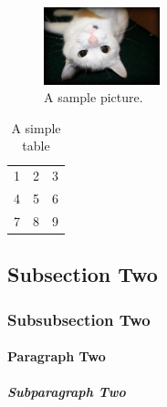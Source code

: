 \documentclass{doc}
\begin{document}
\begin{figure}[ht]
	\includegraphics[width=0.3\textwidth]{myfigure}
	\caption{A sample picture.}
\end{figure}

\begin{table}[ht]
	\begin{tabular}{| l c r |}
		\hline
		1 & 2 & 3 \\
		4 & 5 & 6 \\
		7 & 8 & 9 \\
		\hline
	\end{tabular}
	\caption{A simple table}
\end{table}

\subsection{Subsection Two}
\blindtext

\subsubsection{Subsubsection Two}
\blindtext

\paragraph{Paragraph Two}
\blindtext

\subparagraph{Subparagraph Two}
\blindtext
\end{document}
